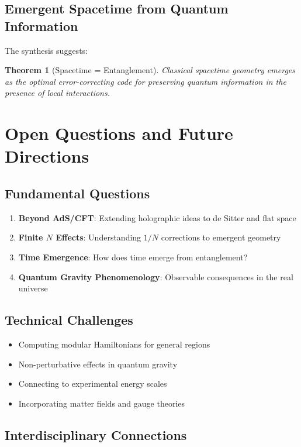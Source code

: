 \documentclass[11pt,letterpaper]{article}
\newtheorem{theorem}{Theorem}[section]
\begin{document}
\subsection{Emergent Spacetime from Quantum Information}

The synthesis suggests:

\begin{theorem}[Spacetime = Entanglement]
Classical spacetime geometry emerges as the optimal error-correcting code for preserving quantum information in the presence of local interactions.
\end{theorem}

\section{Open Questions and Future Directions}

\subsection{Fundamental Questions}

\begin{enumerate}
\item \textbf{Beyond AdS/CFT}: Extending holographic ideas to de Sitter and flat space
\item \textbf{Finite $N$ Effects}: Understanding $1/N$ corrections to emergent geometry
\item \textbf{Time Emergence}: How does time emerge from entanglement?
\item \textbf{Quantum Gravity Phenomenology}: Observable consequences in the real universe
\end{enumerate}

\subsection{Technical Challenges}

\begin{itemize}
\item Computing modular Hamiltonians for general regions
\item Non-perturbative effects in quantum gravity
\item Connecting to experimental energy scales
\item Incorporating matter fields and gauge theories
\end{itemize}

\subsection{Interdisciplinary Connections}
\end{document}
